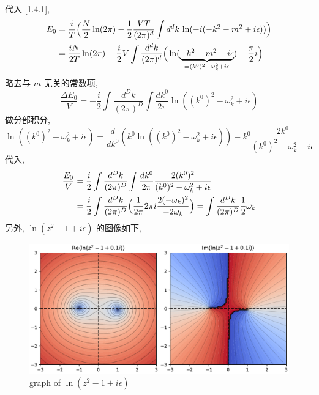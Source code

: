 \begin{itemize}
\begin{tcolorbox}[title=calculation:]
		代入 \eqref{1.4.1},
		\begin{align}
			E_0 &= \frac{i}{T} \Big( \frac{N}{2} \ln (2 \pi) - \frac{1}{2} \frac{V T}{(2 \pi)^d} \int d^d k \, \ln(- i (- k^2 - m^2 + i \epsilon)) \Big) \notag \\
			&= \frac{i N}{2 T} \ln (2 \pi) - \frac{i}{2} V \int \frac{d^d k}{(2 \pi)^d} \Big( \ln(\underbrace{- k^2 - m^2 + i \epsilon}_{= (k^0)^2 - \omega_k^2 + i \epsilon}) - \frac{\pi}{2} i \Big)
		\end{align}
		略去与 $m$ 无关的常数项,
		\begin{equation}
			\frac{\Delta E_0}{V} = - \frac{i}{2} \int \frac{d^D k}{(2 \pi)^D} \int \frac{dk^0}{2 \pi} \ln((k^0)^2 - \omega_k^2 + i \epsilon)
		\end{equation}
		做分部积分,
		\begin{equation}
			\ln((k^0)^2 - \omega_k^2 + i \epsilon) = \frac{d}{dk^0} (k^0 \ln((k^0)^2 - \omega_k^2 + i \epsilon)) - k^0 \frac{2 k^0}{(k^0)^2 - \omega_k^2 + i \epsilon}
		\end{equation}
		代入,
		\begin{align}
			\frac{E_0}{V} &= \frac{i}{2} \int \frac{d^D k}{(2 \pi)^D} \int \frac{dk^0}{2 \pi} \frac{2 (k^0)^2}{(k^0)^2 - \omega_k^2 + i \epsilon} \notag \\
			&= \frac{i}{2} \int \frac{d^D k}{(2 \pi)^D} \Big( \frac{1}{2 \pi} 2 \pi i \frac{2 (- \omega_k)^2}{- 2 \omega_k} \Big) = \int \frac{d^D k}{(2 \pi)^D} \frac{1}{2} \omega_k
		\end{align}
		另外, $\ln(z^2 - 1 + i \epsilon)$ 的图像如下,
		
		\begin{figure}[H]
			\centering
			\includegraphics[scale=0.5]{figures/ln(z^2 - 1 + i epsilon).pdf}
			\caption{graph of $\ln(z^2 - 1 + i \epsilon)$}
		\end{figure}
	\end{tcolorbox}
\end{itemize}
